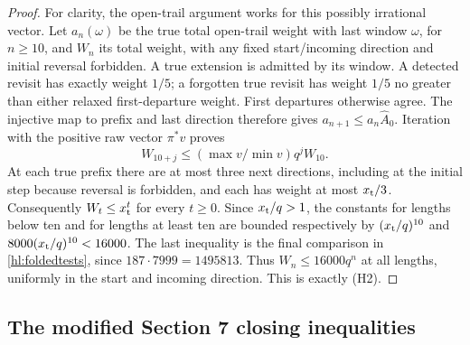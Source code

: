 \begin{proof}
For clarity, the open-trail argument works for this possibly
irrational vector.  Let $a_n(\omega)$ be the true total
open-trail weight with last window $\omega$, for $n\ge10$,
and $W_n$ its total weight, with any fixed start/incoming
direction and initial reversal forbidden.  A true extension
is admitted by its window.  A detected revisit has exactly
weight $1/5$; a forgotten true revisit has weight $1/5$ no
greater than either relaxed first-departure weight.  First
departures otherwise agree.  The injective map to prefix and
last direction therefore gives $a_{n+1}\le a_n\widehat A_0$.
Iteration with the positive raw vector $\pi^*v$ proves
\[
 W_{10+j}\le(\max v/\min v)q^jW_{10}.
\]
At each true prefix there are at most three next directions,
including at the initial step because reversal is forbidden,
and each has weight at most $x_{\rm t}/3$.  Consequently
$W_t\le x_{\rm t}^t$ for every $t\ge0$.  Since
$x_{\rm t}/q>1$, the constants for lengths below ten and
for lengths at least ten are bounded respectively by
$(x_{\rm t}/q)^{10}$ and
$8000(x_{\rm t}/q)^{10}<16000$.
The last inequality is the final comparison in
\eqref{hl:foldedtests}, since $187\cdot7999=1495813$.
Thus $W_n\le16000q^n$ at all lengths, uniformly in the
start and incoming direction.  This is exactly (H2).
\end{proof}

\subsection{The modified Section 7 closing inequalities}

